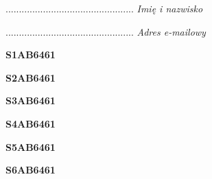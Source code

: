 \begin{turn}{90}\begin{minipage}{\linewidth} \vspace{20mm} ................................................  \textit{Imię i nazwisko}\end{minipage}\end{turn}

\begin{turn}{90}\begin{minipage}{\linewidth} \vspace{20mm} ................................................  \textit{Adres e-mailowy}\end{minipage}\end{turn}

\begin{turn}{90}\huge \begin{minipage}{\linewidth} \vspace{10mm}\textbf{S1AB6461}\end{minipage}\end{turn}

\begin{turn}{90}\huge \begin{minipage}{\linewidth} \vspace{10mm}\textbf{S2AB6461}\end{minipage}\end{turn}

\begin{turn}{90}\huge \begin{minipage}{\linewidth} \vspace{10mm}\textbf{S3AB6461}\end{minipage}\end{turn}

\begin{turn}{90}\huge \begin{minipage}{\linewidth} \vspace{10mm}\textbf{S4AB6461}\end{minipage}\end{turn}

\begin{turn}{90}\huge \begin{minipage}{\linewidth} \vspace{10mm}\textbf{S5AB6461}\end{minipage}\end{turn}

\begin{turn}{90}\huge \begin{minipage}{\linewidth} \vspace{10mm}\textbf{S6AB6461}\end{minipage}\end{turn}

